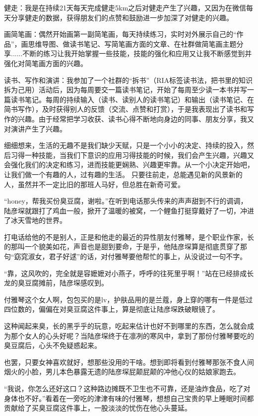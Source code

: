 \documentclass[11pt,a4paper]{article}
\begin{document}
健走：我是在持续21天每天完成健走5km之后对健走产生了兴趣，又因为在微信每天分享健走的数据，获得朋友们的点赞和鼓励进一步加深了对健走的兴趣。﻿﻿

画简笔画：偶然开始画第一副简笔画，每天持续练习，实时对外展示自己的“作品”，画思维导图、做读书笔记、写简笔画方面的文章、在社群做简笔画主题分享......不断的练习让我开始掌握一些技能，技能的强化和应用又让我不断感觉到并强化对简笔画方面的兴趣。﻿﻿

读书、写作和演讲：我参加了一个社群的“拆书”（RIA标签读书法，把书里的知识拆为己用）活动后，因为每周要交一篇读书笔记，开始了每周至少读一本书并写一篇读书笔记。每周的持续输入（读书、读别人的读书笔记）和输出（读书笔记、在简书写作），及时获得别人的反馈（交流、点赞和打赏），于是我表现出了读书和写作的兴趣。由于经常把学习收获、读书心得不断地向身边的同事、朋友分享，我又对演讲产生了兴趣。﻿﻿﻿﻿﻿﻿﻿﻿﻿

细细想来，生活的无趣不是我们缺少天赋，只是一个小小的决定、持续的投入，然后习得一种技能，当我们下意识的应用习得技能的时候，我们会产生兴趣，兴趣又会强化我们的决定和练习，进而技能更娴熟、兴趣更牢靠。从一个小决定开始吧，让我们做一个有趣的人，过有趣的生活。
只要往前走，总能遇见新的风景新的人，虽然并不一定比旧的那班人马好，但总胜在新奇可爱。﻿﻿

“honey，帮我买份臭豆腐，谢啦。”在听到电话那头传来的声声甜到不行的调调，陆彦堔就跟打了鸡血一般，掀开了温暖的被窝，一个鲤鱼打挺穿戴好了一切，冲进了冰天雪地的世界。﻿﻿

打电话给他的不是别人，正是和他走的最近的异性朋友付雅琴，是个职业作家，长的那叫一个貌美如花，声音也是甜到要命，于是乎，他陆彦堔算是彻底贯穿了那句“窈窕淑女，君子好逑”的话，对付雅琴要他帮忙的事上，从没说过一句不字。﻿﻿

“靠，这风吹的，完全就是容嬷嬷对小燕子，呼呼的往死里乎啊！”站在已经排成长龙的臭豆腐摊前，陆彦堔感叹到。﻿﻿

付雅琴这个女人啊，包包买的是lv，护肤品用的是兰蔻，身上穿的哪有一件是低过四位数的，偏偏在对臭豆腐这件事上，算是彻底让陆彦堔跌破眼镜了。﻿﻿

这种闻起来臭，长的黑乎乎的玩意，吃起来估计也好不到哪里的东西，怎么就会成为那个女人的心头好呢？当陆彦堔终于在凛冽的寒风中，拿到了那份付雅琴要吃的臭豆腐后，心头不免疑惑起来。﻿﻿

也罢，只要女神喜欢就好，想那些没用的干啥。想到即将看到付雅琴那张不食人间烟火的小脸，男儿本色暴露无遗的陆彦堔屁颠屁颠的冲他心仪的姑娘家跑去。﻿﻿﻿

“我说，你怎么还好这口？这种路边摊既不卫生也不可靠，还是油炸食品，吃了对身体也不好。”看着在一旁吃的津津有味的付雅琴，想想自己宝贵的早上睡眠时间都贡献给了买臭豆腐这件事上，一股淡淡的忧伤在他心头蔓延。﻿﻿
\end{document}
